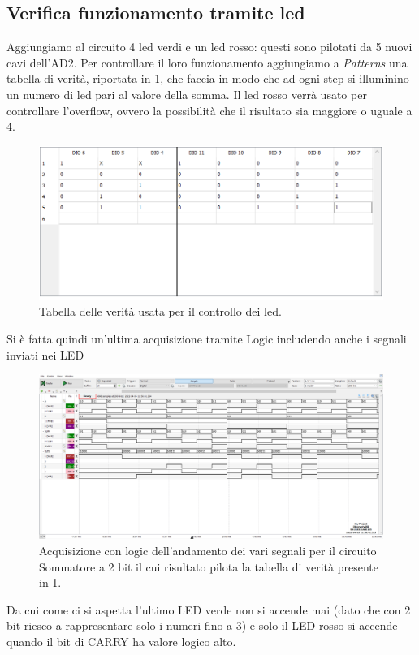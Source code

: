 \documentclass[10pt, a4paper, italian]{article}
\begin{document}
\subsection{Verifica funzionamento tramite led}

Aggiungiamo al circuito 4 led verdi e un led rosso: questi sono pilotati da 5 nuovi cavi dell'AD2. Per controllare il loro funzionamento aggiungiamo a \emph{Patterns} una tabella di verità, riportata in \cref{fig: Ver}, che faccia in modo che ad ogni step si illuminino un numero di led pari al valore della somma. Il led rosso verrà usato per controllare l'overflow, ovvero la possibilità che il risultato sia maggiore o uguale a 4.

\begin{figure}[htbp]
    \centering
    \includegraphics[width=0.8\linewidth]{TAB_LED}
    \caption{\label{fig: Ver} Tabella delle verità usata per il controllo dei led.}
    
\end{figure}

Si è fatta quindi un'ultima acquisizione tramite Logic includendo anche i segnali inviati nei LED


\begin{figure}[htbp]
    \centering
    \includegraphics[width=0.8\linewidth]{sum_time_ROM}
    \caption{\label{fig: ROM_sommatore}Acquisizione con logic dell'andamento dei vari segnali per il circuito Sommatore a 2 bit il cui risultato pilota la tabella di verità presente in \ref{fig: Ver}.}
\end{figure}
Da cui come ci si aspetta l'ultimo LED verde non si accende mai (dato che con 2 bit riesco a rappresentare solo i numeri fino a 3) e solo il LED rosso si accende quando il bit di CARRY ha valore logico alto.
\end{document}
